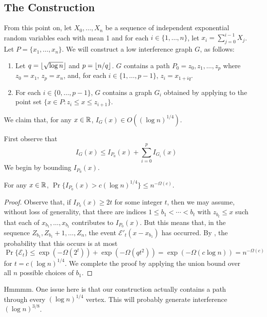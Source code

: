 \documentclass{patmorin}
\begin{document}
\subsection{The Construction}

From this point on, let $X_0,\ldots,X_n$ be a sequence of independent exponential random variables each with mean 1 and for each $i\in\{1,\ldots,n\}$, let $x_i=\sum_{j=0}^{i-1} X_j$.  Let $P=\{x_1,\ldots,x_n\}$.  We will construct a low interference graph $G$, as follows:
\begin{enumerate}
  \item Let $q={\lfloor \sqrt{\log n} \rfloor}$ and $p={\lfloor n/q \rfloor}$.  $G$ contains a path $P_0=z_0,z_1,\ldots,z_p$ where $z_0=x_1$, $z_p=x_n$, and, for each $i\in\{1,\ldots,p-1\}$, $z_i = x_{1+iq}$.
  \item For each $i\in\{0,\ldots,p-1\}$, $G$ contains a graph $G_i$ obtained by applying  to the point set $\{x\in P: z_i \le x \le z_{i+1}\}$.
\end{enumerate}

We claim that, for any $x\in\mathbb{R}$,  $I_G(x) \in O((\log n)^{1/4})$.  

First observe that
\[
    I_G(x) \le I_{P_0}(x) + \sum_{i=0}^p I_{G_i}(x) 
\]
We begin by bounding $I_{P_0}(x)$.

\begin{lem}
  For any $x\in\mathbb{R}$, $\Pr\{I_{P_0}(x) > c(\log n)^{1/4}\} \le n^{-\Omega(c)}$.
\end{lem}

\begin{proof}
  Observe that, if $I_{P_0}(x) \ge 2t$ for some integer $t$, then we may assume, without loss of generality, that there are indices $1\le b_1<\cdots<b_t$ with $z_{b_t} \le x$ such that each of $x_{b_1},\ldots,x_{b_t}$ contributes to $I_{P_0}(x)$.  But this means that, in the sequence $Z_{b_1},Z_{b_1}+1,\ldots,Z_n$, the event $\mathcal{E}'_{t}(x-x_{b_1})$ has occurred.  By , the probability that this occurs is at most
  \[
     \Pr\{\mathcal{E}_t\} \le \exp(-\Omega(2^t)) + \exp(-\Omega(qt^2)) = \exp(-\Omega(c\log n)) = n^{-\Omega(c)}
  \]
  for $t=c(\log n)^{1/4}$.  We complete the proof by applying the union bound over all $n$ possible choices of $b_1$.
\end{proof}

Hmmmm. One issue here is that our construction actually contains a path through every $(\log n)^{1/4}$ vertex. This will probably generate interference $(\log n)^{3/8}$.
\end{document}
